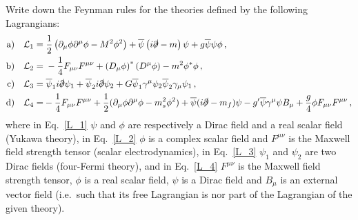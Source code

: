 \begin{ex} \label{ex_30} 
    Write down the Feynman rules for the theories defined by the following Lagrangians:
        \begin{align}
           {\rm a)} \quad \mathcal{L}_1 = &\; \frac{1}{2}\left( \partial_\mu \phi \partial^\mu \phi - M^2 \phi^2\right) + \overline{\psi} \left( i \slashed{\partial} - m \right)\psi + g \overline{\psi} \psi \phi \,, \label{L_1}\\
           {\rm b)} \quad \mathcal{L}_2 = &\; -\frac{1}{4} F_{\mu \nu} F^{\mu \nu} + \left(D_\mu \phi \right)^* \left(D^\mu \phi \right) - m^2 \phi^* \phi\,, \label{L_2} \\
           {\rm c)} \quad \mathcal{L}_3 = &\; \overline{\psi}_1 i \slashed{\partial} \psi_1 + \overline{\psi}_2 i \slashed{\partial} \psi_2 + G \overline{\psi}_1 \gamma^\mu \psi_2 \overline{\psi}_2 \gamma_\mu \psi_1 \,, \label{L_3} \\
           {\rm d)} \quad \mathcal{L}_4 = & -\frac{1}{4} F_{\mu \nu} F^{\mu \nu} + \frac{1}{2} (\partial_\mu\phi \partial^\mu\phi - m_s^2 \phi^2) + \overline{\psi}(i\slashed{\partial} - m_f) \psi - g'\overline{\psi} \gamma^\mu \psi B_\mu + \frac{g}{4} \phi F_{\mu \nu} F^{\mu \nu} \,, \label{L_4}
        \end{align}
        where in Eq.~\eqref{L_1} $\psi$ and $\phi$ are respectively a Dirac field and a real scalar field (Yukawa theory), in Eq.~\eqref{L_2} $\phi$ is a complex scalar field and $F^{\mu \nu}$ is the Maxwell field strength tensor (scalar electrodynamics), in Eq.~\eqref{L_3} $\psi_1$ and $\psi_2$ are two Dirac fields (four-Fermi theory), and in Eq.~\eqref{L_4} $F^{\mu \nu}$ is the Maxwell field strength tensor, $\phi$ is a real scalar field, $\psi$ is a Dirac field and $B_\mu$ is an external vector field (i.e.~such that its free Lagrangian is nor part of the Lagrangian of the given theory).
\end{ex}


